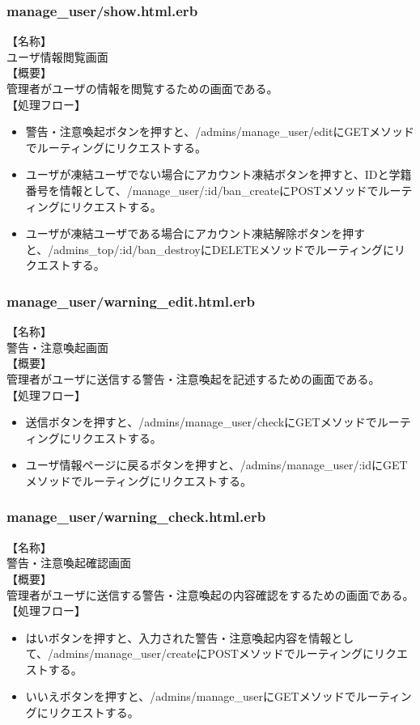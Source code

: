 \documentclass[a4j]{jarticle}
\begin{document}
\subsubsection{manage\_user/show.html.erb}
\noindent
【名称】\\
ユーザ情報閲覧画面\\
【概要】\\
管理者がユーザの情報を閲覧するための画面である。\\
【処理フロー】
\begin{itemize}
  \item 警告・注意喚起ボタンを押すと、/admins/manage\_user/editにGETメソッドでルーティングにリクエストする。
  \item ユーザが凍結ユーザでない場合にアカウント凍結ボタンを押すと、IDと学籍番号を情報として、/manage\_user/:id/ban\_createにPOSTメソッドでルーティングにリクエストする。
  \item ユーザが凍結ユーザである場合にアカウント凍結解除ボタンを押すと、/admins\_top/:id/ban\_destroyにDELETEメソッドでルーティングにリクエストする。
\end{itemize}



\subsubsection{manage\_user/warning\_edit.html.erb}
\noindent
【名称】\\
警告・注意喚起画面\\
【概要】\\
管理者がユーザに送信する警告・注意喚起を記述するための画面である。\\
【処理フロー】
\begin{itemize}
  \item 送信ボタンを押すと、/admins/manage\_user/checkにGETメソッドでルーティングにリクエストする。
  \item ユーザ情報ページに戻るボタンを押すと、/admins/manage\_user/:idにGETメソッドでルーティングにリクエストする。
\end{itemize}

\subsubsection{manage\_user/warning\_check.html.erb}
\noindent
【名称】\\
警告・注意喚起確認画面\\
【概要】\\
管理者がユーザに送信する警告・注意喚起の内容確認をするための画面である。\\
【処理フロー】
\begin{itemize}
  \item はいボタンを押すと、入力された警告・注意喚起内容を情報として、/admins/manage\_user/createにPOSTメソッドでルーティングにリクエストする。
  \item いいえボタンを押すと、/admins/manage\_userにGETメソッドでルーティングにリクエストする。
\end{itemize}
\end{document}
